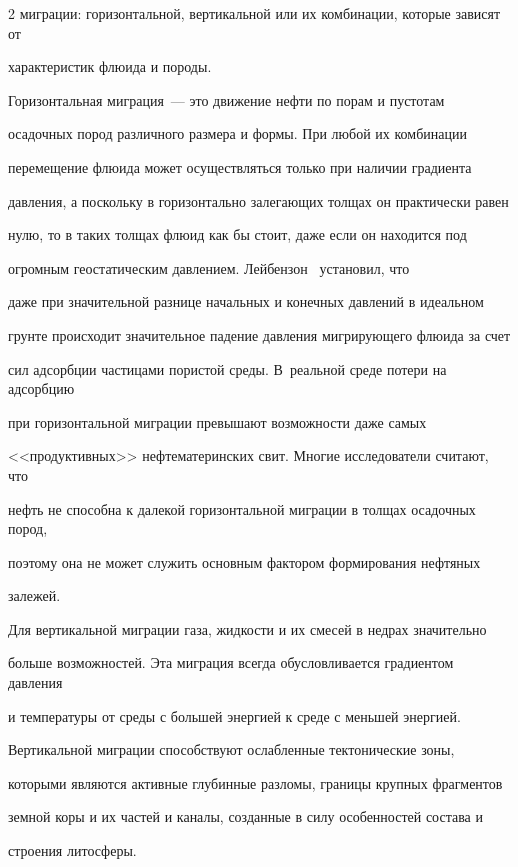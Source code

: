 \begin{multicols}{2}
миграции: горизонтальной, вертикальной или их комбинации, которые зависят от 

характеристик флюида и породы.

     

     Горизонтальная миграция~--- это движение нефти по порам и пустотам 

осадочных пород различного размера и формы. При любой их комбинации 

перемещение флюида может осуществляться только при наличии градиента 

давления, а поскольку в горизонтально залегающих толщах он практически равен 

нулю, то в таких толщах флюид как бы стоит, даже если он находится под 

огромным геостатическим давлением. Лейбензон~\cite{12s} установил, что 

даже при значительной разнице начальных и конечных давлений в идеальном 

грунте происходит значительное падение давления мигрирующего флюида за счет 

сил адсорбции частицами пористой среды. В~реальной среде потери на адсорбцию 

при горизонтальной миграции превышают возможности даже самых 

<<продуктивных>> нефтематеринских свит. Многие исследователи считают, что 

нефть не способна к далекой горизонтальной миграции в толщах осадочных пород, 

поэтому она не может служить основным фактором формирования нефтяных 

залежей. 

     

     Для вертикальной миграции газа, жидкости и их смесей в недрах значительно 

больше возможностей. Эта миграция всегда обусловливается градиентом давления 

и температуры от среды с большей энергией к среде с меньшей энергией. 

Вертикальной миграции способствуют ослабленные тектонические зоны, 

которыми являются активные глубинные разломы, границы крупных фрагментов 

земной коры и их частей и каналы, созданные в силу особенностей состава и 

строения литосферы.

     


\end{multicols}
